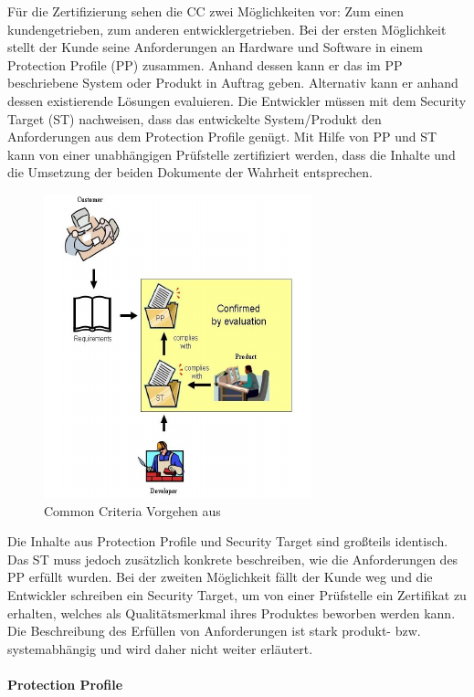\documentclass[11pt,a4paper]{report}
\begin{document}
Für die Zertifizierung sehen die CC zwei Möglichkeiten vor: Zum einen kundengetrieben, zum anderen entwicklergetrieben. Bei der ersten Möglichkeit stellt der Kunde seine Anforderungen an Hardware und Software in einem Protection Profile (PP) zusammen. Anhand dessen kann er das im PP beschriebene System oder Produkt in Auftrag geben. Alternativ kann er anhand dessen existierende Lösungen evaluieren. Die Entwickler müssen mit dem Security Target (ST) nachweisen, dass das entwickelte System/Produkt den Anforderungen aus dem Protection Profile genügt. Mit Hilfe von PP und ST kann von einer unabhängigen Prüfstelle zertifiziert werden, dass die Inhalte und die Umsetzung der beiden Dokumente der Wahrheit entsprechen.

\begin{figure}[htbp]
\centering
\includegraphics[scale=1.8]{images/cc_prozess.pdf}
\caption[]{Common Criteria Vorgehen aus \cite{bsi_ccguide}}
\label{fig:cc_prozess}
\end{figure}

Die Inhalte aus Protection Profile und Security Target sind großteils identisch. Das ST muss jedoch zusätzlich konkrete beschreiben, wie die Anforderungen des PP erfüllt wurden. Bei der zweiten Möglichkeit fällt der Kunde weg und die Entwickler schreiben ein Security Target, um von einer Prüfstelle ein Zertifikat zu erhalten, welches als Qualitätsmerkmal ihres Produktes beworben werden kann. Die Beschreibung des Erfüllen von Anforderungen ist stark produkt- bzw. systemabhängig und wird daher nicht weiter erläutert.

\paragraph{Protection Profile}
\end{document}

